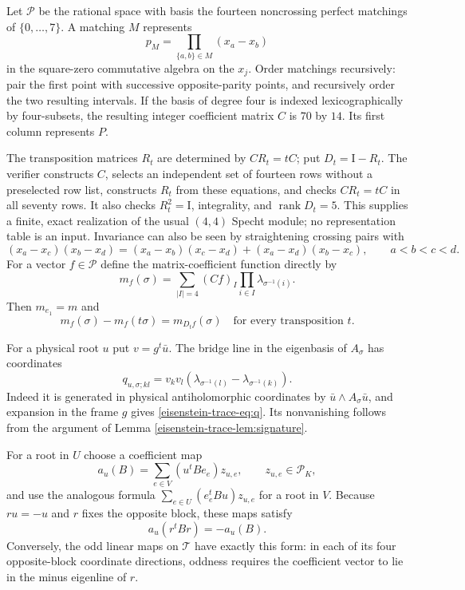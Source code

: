\documentclass[11pt]{article}
\theoremstyle{definition}
\theoremstyle{remark}
\newcommand{\cP}{\mathcal P}
\newcommand{\Id}{\mathrm I}
\begin{document}
Let $\cP$ be the rational space with basis the fourteen noncrossing
perfect matchings of $\{0,\ldots,7\}$.  A matching $M$ represents
\[
 p_M=\prod_{\{a,b\}\in M}(x_a-x_b)
\]
in the square-zero commutative algebra on the $x_j$.  Order matchings
recursively: pair the first point with successive opposite-parity
points, and recursively order the two resulting intervals.  If the
basis of degree four is indexed lexicographically by four-subsets,
the resulting integer coefficient matrix $C$ is $70$ by $14$.  Its
first column represents $P$.

The transposition matrices $R_t$ are determined by $CR_t=tC$;
put $D_t=\Id-R_t$.  The verifier constructs $C$, selects an independent
set of fourteen rows without a preselected row list, constructs $R_t$
from these equations, and checks $CR_t=tC$ in all seventy rows.
It also checks $R_t^2=\Id$, integrality, and $\operatorname{rank}D_t=5$.
This supplies a finite, exact realization of the usual $(4,4)$ Specht
module; no representation table is an input.  Invariance can also be
seen by straightening crossing pairs with
\[
 (x_a-x_c)(x_b-x_d)
 =(x_a-x_b)(x_c-x_d)+(x_a-x_d)(x_b-x_c),\qquad a<b<c<d.
\]
For a vector $f\in\cP$ define the matrix-coefficient function directly by
\[
 m_f(\sigma)=\sum_{|I|=4}(Cf)_I\prod_{i\in I}\lambda_{\sigma^{-1}(i)}.
\]
Then $m_{e_1}=m$ and
\begin{equation}\label{eisenstein-trace-eq:matrix-coeff}
 m_f(\sigma)-m_f(t\sigma)=m_{D_tf}(\sigma)
 \quad\text{for every transposition }t.
\end{equation}

For a physical root $u$ put $v=g^t\bar u$.  The bridge line in the
eigenbasis of $A_\sigma$ has coordinates
\begin{equation}\label{eisenstein-trace-eq:q}
 q_{u,\sigma;kl}=v_kv_l
       (\lambda_{\sigma^{-1}(l)}-\lambda_{\sigma^{-1}(k)}).
\end{equation}
Indeed it is generated in physical antiholomorphic coordinates by
$\bar u\wedge A_\sigma\bar u$, and expansion in the frame $g$
gives \eqref{eisenstein-trace-eq:q}.  Its nonvanishing follows from the argument of
Lemma \ref{eisenstein-trace-lem:signature}.

For a root in $U$ choose a coefficient map
\[
 a_u(B)=\sum_{e\in V}(u^tBe_e)z_{u,e},\qquad z_{u,e}\in\cP_K,
\]
and use the analogous formula
$\sum_{e\in U}(e_e^tBu)z_{u,e}$ for a root in $V$.
Because $ru=-u$ and $r$ fixes the opposite block, these maps satisfy
\begin{equation}\label{eisenstein-trace-eq:anti}
 a_u(r^tBr)=-a_u(B).
\end{equation}
Conversely, the odd linear maps on $\mathcal T$ have exactly this form:
in each of its four opposite-block coordinate directions, oddness
requires the coefficient vector to lie in the minus eigenline of $r$.
\end{document}
